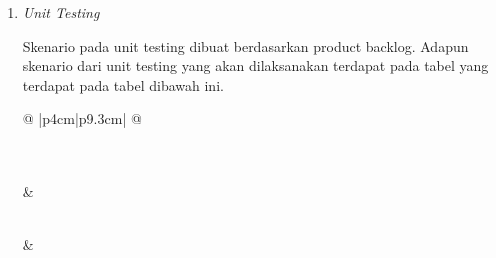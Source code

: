 \begin{enumerate}
\setlength{\enumerateparindent}{2em}
	\item{\textit{Unit Testing}}

	\hspace{\enumerateparindent} Skenario pada unit testing dibuat berdasarkan product backlog. Adapun skenario dari unit testing yang akan dilaksanakan terdapat pada tabel yang terdapat pada tabel dibawah ini.

\begin{longtable}[c]{@{} |p{4cm}|p{9.3cm}| @{}}
  \caption{Skenario \textit{Unit Testing} \label{unit_testing}}\\
 
  \hline
  \\
  \hline
   &   
  \endfirsthead
 
  \hline
  \\
  \hline
   & 
  \endhead
 
  \hline
  \endfoot
 
  \hline
  \endlastfoot
 

\end{longtable}
\end{enumerate}
